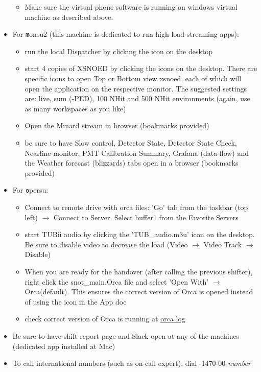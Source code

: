 \documentclass[12pt, oneside, a4paper]{article}
\begin{document}
\begin{itemize}
\begin{itemize}
		\item Make sure the virtual phone software is running on windows virtual machine as described above.
	\end{itemize}
	\item For {\texttt monsu2} (this machine is dedicated to run high-load streaming apps):
	\begin{itemize}
		\item run the local Dispatcher by clicking the icon on the desktop
		\item start 4 copies of XSNOED by clicking the icons on the desktop. There are specific icons to open Top or Bottom view xsnoed, each of which will open the application on the respective monitor. The suggested settings are: live, sum (-PED), 100 NHit and 500 NHit environments (again, use as many workspaces as you like)
		\item Open the Minard stream in browser (bookmarks provided)
\item be sure to have Slow control, Detector State, Detector State Check, Nearline monitor, PMT Calibration Summary, Grafana (data-flow) and the Weather forecast (blizzards) tabs open in a browser (bookmarks provided)

	\end{itemize}
\item For {\texttt opersu}:
	\begin{itemize}
		\item Connect to remote drive with orca files: 'Go' tab from the taskbar (top left) $\rightarrow$ Connect to Server. Select buffer1 from the Favorite Servers
		\item start TUBii audio by clicking the 'TUB\_audio.m3u' icon on the desktop. Be sure to disable video to decrease the load (Video $\rightarrow$ Video Track $\rightarrow$ Disable)
		\item When you are ready for the handover (after calling the previous shifter), right click the snot\_main.Orca file and select 'Open With' $\rightarrow$ Orca(default). This ensures the correct version of Orca is opened instead of using the icon in the App doc
		\item check correct version of Orca is running at \href{https://snopl.us/monitoring/orca-session-logs}{orca log}
	\end{itemize}
\item Be sure to have shift report page and Slack open at any of the machines (dedicated app installed at Mac)
\item To call international numbers (such as on-call expert), dial -1470-00-\textit{number}
\end{itemize}
\end{document}
